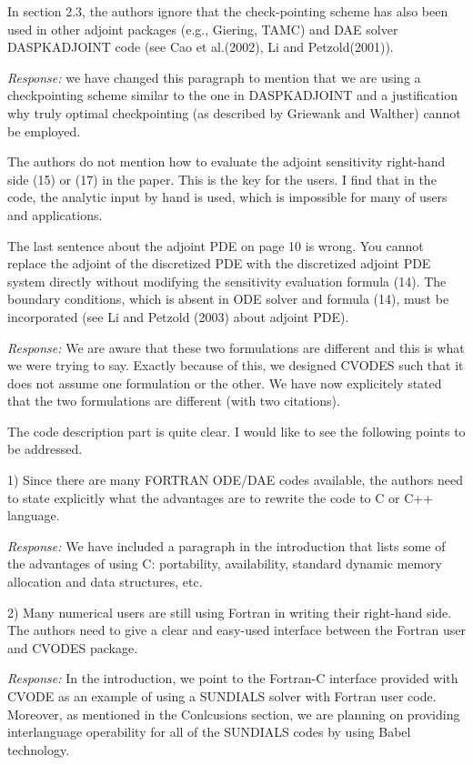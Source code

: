In section 2.3, the authors ignore that the check-pointing
scheme has also been used in other adjoint packages (e.g.,
Giering, TAMC) and DAE solver DASPKADJOINT code (see Cao et
al.(2002), Li and Petzold(2001)). 

{\em Response:} 
we have changed this paragraph to mention that we are 
using a checkpointing scheme similar to the one in DASPKADJOINT
and a justification why truly optimal checkpointing (as described
by Griewank and Walther) cannot be employed.

The authors do not mention how to evaluate the adjoint sensitivity 
right-hand side (15) or (17) in the paper. This is the key for the users. 
I find that in the code, the analytic input by hand is used, which is impossible
for many of users and applications. 

The last sentence about the adjoint PDE on page 10 is wrong. 
You cannot replace the adjoint of the discretized PDE with the 
discretized adjoint PDE system directly without modifying the 
sensitivity evaluation formula (14). The boundary conditions, 
which is absent in ODE solver and formula (14), must be incorporated 
(see Li and Petzold (2003) about adjoint PDE). 

{\em Response:}
 We are aware that these two formulations are different and this
is what we were trying to say. Exactly because of this, we designed 
CVODES such that it does not assume one formulation or the other.
We have now explicitely stated that the two formulations are different
(with two citations).

The code description part is quite clear. I would like to see
the following points to be addressed. 

1) Since there are many FORTRAN ODE/DAE codes available, the authors need to 
state explicitly what the advantages are to rewrite the code to C or C++
language. 

{\em Response:}
We have included a paragraph in the introduction that lists
some of the advantages of using C: portability, availability, standard
dynamic memory allocation and data structures, etc.

2) Many numerical users are still using Fortran in writing their right-hand 
side. The authors need to give a clear and easy-used interface between the 
Fortran user and CVODES package. 

{\em Response:}
In the introduction, we point to the Fortran-C interface provided
with CVODE as an example of using a SUNDIALS solver with Fortran user code.
Moreover, as mentioned in the Conlcusions section, we are planning on
providing interlanguage operability for all of the SUNDIALS codes by using
Babel technology.

